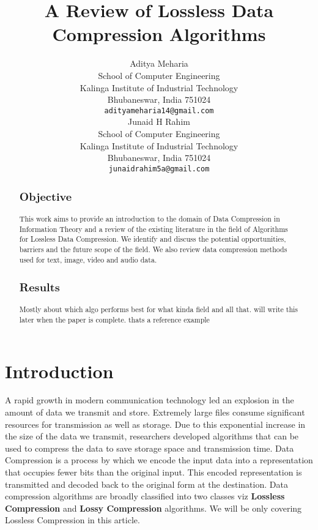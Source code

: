 \documentclass{article}
\title{A Review of Lossless Data Compression Algorithms}
\author{
	Aditya Meharia\\
	School of Computer Engineering\\
	Kalinga Institute of Industrial Technology\\
	Bhubaneswar, India 751024 \\
	\texttt{adityameharia14@gmail.com} \\
	\And
   	Junaid H Rahim\\
	School of Computer Engineering\\
	Kalinga Institute of Industrial Technology\\
	Bhubaneswar, India 751024 \\
	\texttt{junaidrahim5a@gmail.com} \\	
}
\begin{document}
\maketitle

\begin{abstract}
	
\subsection*{Objective}

This work aims to provide an introduction to the domain of Data Compression in Information Theory and a review of the existing literature in the field of Algorithms for Lossless Data Compression. We identify and discuss the potential opportunities, barriers and the future scope of the field. We also review data compression methods used for text, image, video and  audio data.

\subsection*{Results}
Mostly about which algo performs best for what kinda field and all that. will write this later when the paper is complete. \cite{parekar2014lossless} thats a reference example



\end{abstract}



\section{Introduction}

A rapid growth in modern communication technology led an explosion in the amount of data we transmit and store. Extremely large files consume significant resources for transmission as well as storage. Due to this exponential increase in the size of the data we transmit, 
researchers developed algorithms that can be used to compress the data to save storage space and transmission time. Data Compression is a process by which we encode the input data into a representation that occupies fewer bits than the original input. This encoded representation is transmitted and decoded back to the original form at the destination. Data compression algorithms are broadly classified into two classes viz \textbf{Lossless Compression} and \textbf{Lossy Compression} algorithms. We will be only covering Lossless Compression in this article.
\end{document}
